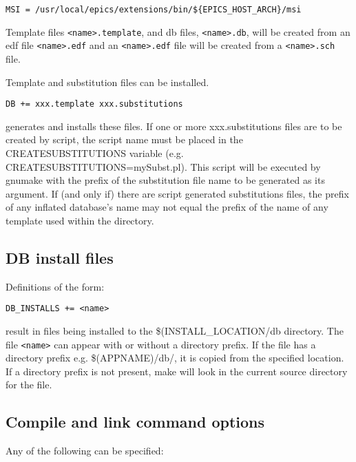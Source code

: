 \begin{verbatim}
MSI = /usr/local/epics/extensions/bin/${EPICS_HOST_ARCH}/msi
\end{verbatim}

Template files \verb|<name>.template|, and db files, \verb|<name>.db|, will be created from an edf file \verb|<name>.edf| and an 
\verb|<name>.edf| file will be created from a \verb|<name>.sch| file.

Template and substitution files can be installed.

\begin{verbatim}
DB += xxx.template xxx.substitutions
\end{verbatim}

generates and installs these files. If one or more xxx.substitutions files are to be created by script, the script name must be 
placed in the CREATESUBSTITUTIONS variable (e.g. CREATESUBSTITUTIONS=mySubst.pl). This script will be 
executed by gnumake with the prefix of the substitution file name to be generated as its argument. If (and only if) there 
are script generated substitutions files, the prefix of any inflated database's name may not equal the prefix of the name of 
any template used within the directory.

\subsection{DB install files}

Definitions of the form:

\begin{verbatim}
DB_INSTALLS += <name>
\end{verbatim}

result in files being installed to the \$(INSTALL\_LOCATION/db directory. The file \verb|<name>| can appear with or without a 
directory prefix. If the file has a directory prefix e.g. \$(APPNAME)/db/, it is copied from the specified location. If a 
directory prefix is not present, make will look in the current source directory for the file.

\subsection{Compile and link command options}

Any of the following can be specified:


